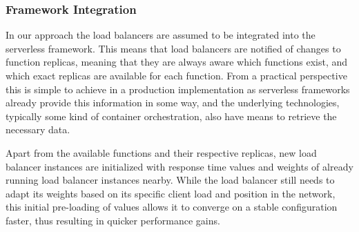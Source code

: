 \subsubsection{Framework Integration}
In our approach the load balancers are assumed to be integrated into the serverless framework.
This means that load balancers are notified of changes to function replicas, meaning that they are always aware which functions exist, and which exact replicas are available for each function.
From a practical perspective this is simple to achieve in a production implementation as serverless frameworks already provide this information in some way, and the underlying technologies, typically some kind of container orchestration, also have means to retrieve the necessary data.

Apart from the available functions and their respective replicas, new load balancer instances are initialized with response time values and weights of already running load balancer instances nearby.
While the load balancer still needs to adapt its weights based on its specific client load and position in the network, this initial pre-loading of values allows it to converge on a stable configuration faster, thus resulting in quicker performance gains.

